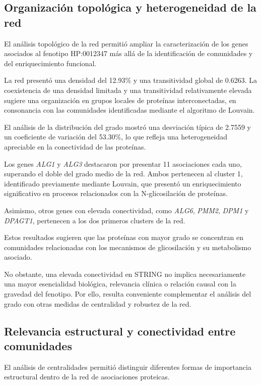 \subsection{Organización topológica y heterogeneidad de la red}

El análisis topológico de la red permitió ampliar la
caracterización de los genes asociados al fenotipo
HP:0012347 más allá de la identificación de comunidades
y del enriquecimiento funcional.

La red presentó una densidad del 12.93\% y una
transitividad global de 0.6263. La coexistencia de
una densidad limitada y una transitividad relativamente
elevada sugiere una organización en grupos locales
de proteínas interconectadas, en consonancia con las
comunidades identificadas mediante el algoritmo de Louvain.

El análisis de la distribución del grado mostró una
desviación típica de 2.7559 y un coeficiente de variación
del 53.30\%, lo que refleja una heterogeneidad apreciable
en la conectividad de las proteínas.

Los genes \textit{ALG1} y \textit{ALG3} destacaron
por presentar 11 asociaciones cada uno, superando
el doble del grado medio de la red. Ambos pertenecen
al cluster 1, identificado previamente mediante Louvain,
que presentó un enriquecimiento significativo en
procesos relacionados con la N-glicosilación de proteínas.

Asimismo, otros genes con elevada conectividad,
como \textit{ALG6}, \textit{PMM2}, \textit{DPM1}
y \textit{DPAGT1}, pertenecen a los dos primeros
clusters de la red.

Estos resultados sugieren que las proteínas con mayor
grado se concentran en comunidades relacionadas con
los mecanismos de glicosilación y su metabolismo
asociado.

No obstante, una elevada conectividad en STRING no
implica necesariamente una mayor esencialidad biológica,
relevancia clínica o relación causal con la gravedad
del fenotipo. Por ello, resulta conveniente complementar
el análisis del grado con otras medidas de centralidad
y robustez de la red.


\subsection{Relevancia estructural y conectividad
entre comunidades}

El análisis de centralidades permitió distinguir
diferentes formas de importancia estructural dentro
de la red de asociaciones proteicas.

